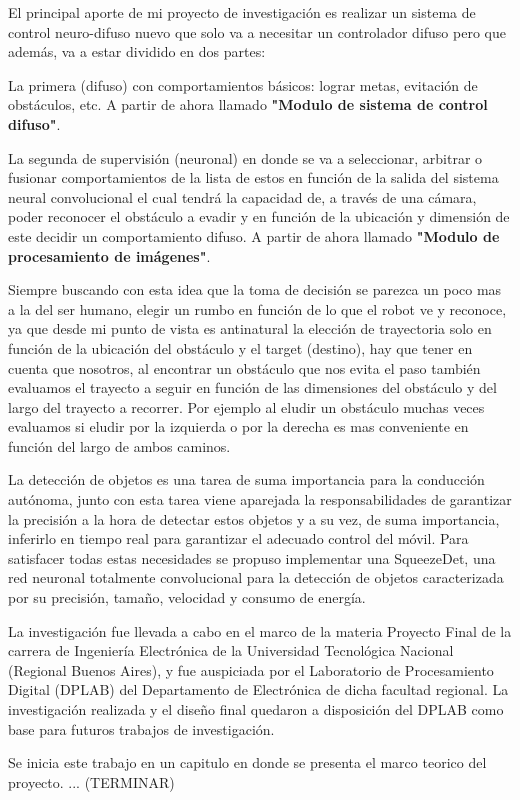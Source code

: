 El principal aporte de mi proyecto de investigación es realizar un sistema de control neuro-difuso nuevo que solo va a necesitar un controlador difuso pero que además, va a estar dividido en dos partes: \par
La primera (difuso) con comportamientos básicos: lograr metas, evitación de obstáculos, etc. A partir de ahora llamado \textbf{"Modulo de sistema de control difuso"}. \par
La segunda de supervisión (neuronal) en donde se va a seleccionar, arbitrar o fusionar comportamientos de la lista de estos en función de la salida del sistema neural convolucional el cual tendrá la capacidad de, a través de una cámara, poder reconocer el obstáculo a evadir y en función de la ubicación y dimensión de este decidir un comportamiento difuso. A partir de ahora llamado \textbf{"Modulo de procesamiento de imágenes"}. \par
Siempre buscando con esta idea que la toma de decisión se parezca un poco mas a la del ser humano, elegir un rumbo en función de lo que el robot ve y reconoce, ya que desde mi punto de vista es antinatural la elección de trayectoria solo en función de la ubicación del obstáculo y el target (destino), hay que tener en cuenta que nosotros, al encontrar un obstáculo que nos evita el paso también evaluamos el trayecto a seguir en función de las dimensiones del obstáculo y del largo del trayecto a recorrer. Por ejemplo al eludir un obstáculo muchas veces evaluamos si eludir por la izquierda o por la derecha es mas conveniente en función del largo de ambos caminos.\par

La detección de objetos es una tarea de suma importancia para la conducción autónoma, junto con esta tarea viene aparejada la responsabilidades de garantizar la precisión a la hora de detectar estos objetos y a su vez, de suma importancia, inferirlo en tiempo real para garantizar el adecuado control del móvil. 
Para satisfacer todas estas necesidades se propuso implementar una SqueezeDet, una red neuronal totalmente convolucional para la detección de objetos caracterizada por su precisión, tamaño, velocidad y consumo de energía. \par

La investigación fue llevada a cabo en el marco de la materia Proyecto Final de la carrera de Ingeniería Electrónica de la Universidad Tecnológica Nacional (Regional Buenos Aires), y fue auspiciada por el Laboratorio de Procesamiento Digital (DPLAB) del Departamento de Electrónica de dicha facultad regional. La investigación realizada y el diseño final quedaron
a disposición del DPLAB como base para futuros trabajos de investigación. \par

Se inicia este trabajo en un capitulo en donde se presenta el marco teorico del proyecto. ... (TERMINAR) \par

